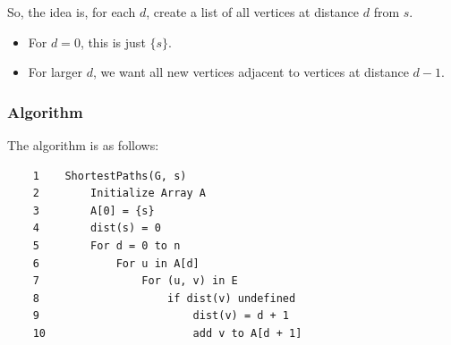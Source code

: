 \documentclass[letterpaper]{article}
\begin{document}
\bigskip 

So, the idea is, for each $d$, create a list of all vertices at distance $d$ from $s$.
\begin{itemize}
    \item For $d = 0$, this is just $\{s\}$.
    \item For larger $d$, we want all new vertices adjacent to vertices at distance $d - 1$.
\end{itemize}

\subsubsection{Algorithm}
The algorithm is as follows:
\begin{verbatim}
    1    ShortestPaths(G, s)
    2        Initialize Array A
    3        A[0] = {s}
    4        dist(s) = 0
    5        For d = 0 to n
    6            For u in A[d]
    7                For (u, v) in E
    8                    if dist(v) undefined
    9                        dist(v) = d + 1
    10                       add v to A[d + 1]
\end{verbatim}
\end{document}
